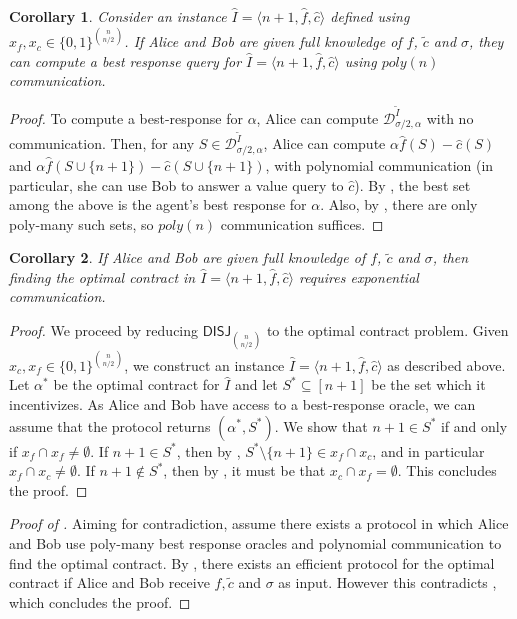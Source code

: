 \documentclass[11pt]{article}
\newtheorem{corollary}{Corollary}
\newcommand{\inst}[3]{\langle #1, #2, #3 \rangle}
\newcommand{\demand}[2]{\mathcal{D}_{{#1},{#2}}}
\newcommand{\BR}[3]{\demand{#1}{#2}^{#3}}
\newcommand{\DISJ}[1]{\mathsf{DISJ}_{#1}}
\newcommand{\tc}{\tilde{c}}
\newcommand{\hf}{\hat{f}}
\newcommand{\hc}{\hat{c}}
\newcommand{\tI}{\tilde{I}}
\newcommand{\hI}{\hat{I}}
\newcommand{\InstHatI}{\hI = \inst{n+1}{\hf}{\hc}}
\begin{document}
\begin{corollary}\label{cor:simulate_BR_f_c_submod}
    Consider an instance $\InstHatI$ defined using $x_f, x_c \in \{0,1\}^{\binom{n}{n/2}}$.
    If Alice and Bob are given full knowledge of $f$, $\tc$ and $\sigma$, they can compute a best response query for $\InstHatI$ using $poly(n)$ communication.
\end{corollary}
\begin{proof}
    To compute a best-response for $\alpha$, Alice can compute $\BR{\sigma/2}{\alpha}{\tI}$ with no communication.
    Then, for any $S \in \BR{\sigma/2}{\alpha}{\tI}$, Alice can compute $\alpha \hf(S)-\hc(S)$ and $\alpha \hf(S\cup\{n+1\})-\hc(S\cup\{n+1\})$, with polynomial communication (in particular, she can use Bob to answer a value query to $\hc$).
    By , the best set among the above is the agent's best response for $\alpha$. 
    Also, by , there are only poly-many such sets, so $poly(n)$ communication suffices.
\end{proof}

\begin{corollary}\label{cor:opt_exp_CC_f_c_submod}
    If Alice and Bob are given full knowledge of $f$, $\tc$ and $\sigma$, then finding the optimal contract in $\InstHatI$ requires exponential communication.
\end{corollary}

\begin{proof}
    We proceed by reducing $\DISJ{\binom{n}{n/2}}$ to the optimal contract problem.
    Given $x_c, x_f \in \{0,1\}^{\binom{n}{n/2}}$, we construct an instance $\InstHatI$ as described above. 
    Let $\alpha^*$ be the optimal contract for $\hI$ and let $S^* \subseteq [n+1]$ be the set which it incentivizes. As Alice and Bob have access to a best-response oracle, we can assume that the protocol returns $(\alpha^*,S^*)$. We show that $n+1 \in S^*$ if and only if $x_f \cap x_f \ne \emptyset$.
    If $n+1 \in S^*$, then by , $S^* \setminus \{n+1\} \in x_f \cap x_c$, and in particular $x_f \cap x_c \ne \emptyset$.
    If $n+1 \notin S^*$, then by , it must be that $x_c \cap x_f = \emptyset$.
    This concludes the proof. \qedhere
\end{proof}

\begin{proof}[Proof of ]
Aiming for contradiction, assume there exists a protocol in which Alice and Bob use poly-many best response oracles and polynomial communication to find the optimal contract.
By , there exists an efficient protocol for the optimal contract if Alice and Bob receive $f,\tc$ and $\sigma$ as input. However this contradicts , which concludes the proof.
\end{proof}
\end{document}
